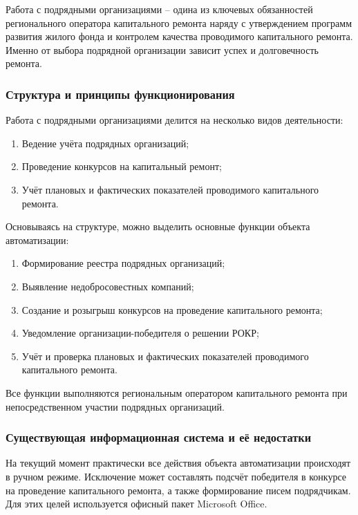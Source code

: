 Работа с подрядными организациями -- одина из ключевых обязанностей регионального оператора капитального ремонта наряду с утверждением программ развития жилого фонда и контролем качества проводимого капитального ремонта.
Именно от выбора подрядной организации зависит успех и долговечность ремонта.

\subsubsection{Структура и принципы функционирования}

Работа с подрядными организациями делится на несколько видов деятельности:

\begin{enumerate}
	\item Ведение учёта подрядных организаций;
	\item Проведение конкурсов на капитальный ремонт;
	\item Учёт плановых и фактических показателей проводимого капитального ремонта.
\end{enumerate}

Основываясь на структуре, можно выделить основные функции объекта автоматизации:

\begin{enumerate}
	\item Формирование реестра подрядных организаций;
	\item Выявление недобросовестных компаний;
	\item Создание и розыгрыш конкурсов на проведение капитального ремонта;
	\item Уведомление организации-победителя о решении РОКР;
	\item Учёт и проверка плановых и фактических показателей проводимого капитального ремонта.
\end{enumerate}

Все функции выполняются региональным оператором капитального ремонта при непосредственном участии подрядных организаций.

\subsubsection{Существующая информационная система и её недостатки}

На текущий момент практически все действия объекта автоматизации происходят в ручном режиме.
Исключение может составлять подсчёт победителя в конкурсе на проведение капитального ремонта, а также формирование писем подрядчикам.
Для этих целей используется офисный пакет Microsoft Office.

